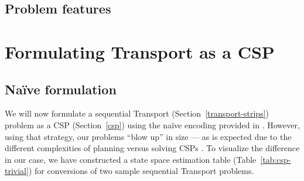 
\subsection{Problem features}

















\section{Formulating Transport as a CSP}\label{csp-formulation}


\subsection{Na{\"{i}}ve formulation}

We will now formulate a sequential Transport (Section~\ref{transport-strips}) problem as a CSP (Section~\ref{csp}) using the na{\"{i}}ve encoding provided in \citet[Section~8.3]{Ghallab2004}.
However, using that strategy, our problems ``blow up'' in size --- as is expected due
to the different complexities of planning versus solving CSPs \citep[Section~8.3.2]{Ghallab2004}. To visualize the difference in our case, we have constructed a state space estimation table (Table~\ref{tab:csp-trivial}) for conversions of two sample sequential Transport problems.

